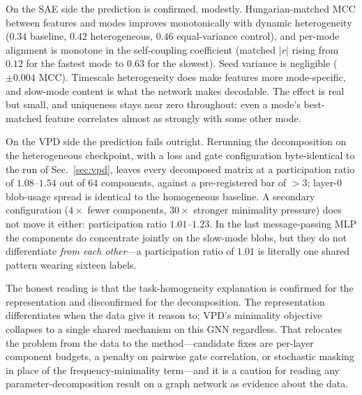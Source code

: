 On the SAE side the prediction is confirmed, modestly. Hungarian-matched MCC
between features and modes improves monotonically with dynamic heterogeneity
($0.34$ baseline, $0.42$ heterogeneous, $0.46$ equal-variance control), and
per-mode alignment is monotone in the self-coupling coefficient (matched $|r|$
rising from $0.12$ for the fastest mode to $0.63$ for the slowest). Seed variance
is negligible ($\pm 0.004$ MCC). Timescale heterogeneity does make features more
mode-specific, and slow-mode content is what the network makes decodable. The
effect is real but small, and uniqueness stays near zero throughout: even a mode's
best-matched feature correlates almost as strongly with some other mode.

On the VPD side the prediction fails outright. Rerunning the decomposition on the
heterogeneous checkpoint, with a loss and gate configuration byte-identical to the
run of Sec.~\ref{sec:vpd}, leaves every decomposed matrix at a participation ratio
of $1.08$--$1.54$ out of $64$ components, against a pre-registered bar of $>3$;
layer-0 blob-usage spread is identical to the homogeneous baseline. A secondary
configuration ($4\times$ fewer components, $30\times$ stronger minimality
pressure) does not move it either: participation ratio $1.01$--$1.23$. In the last
message-passing MLP the components do concentrate jointly on the slow-mode blobs,
but they do not differentiate \emph{from each other}---a participation ratio of
$1.01$ is literally one shared pattern wearing sixteen labels.

The honest reading is that the task-homogeneity explanation is confirmed for the
representation and disconfirmed for the decomposition. The representation
differentiates when the data give it reason to; VPD's minimality objective
collapses to a single shared mechanism on this GNN regardless. That relocates the
problem from the data to the method---candidate fixes are per-layer component
budgets, a penalty on pairwise gate correlation, or stochastic masking in place of
the frequency-minimality term---and it is a caution for reading any
parameter-decomposition result on a graph network as evidence about the data.
